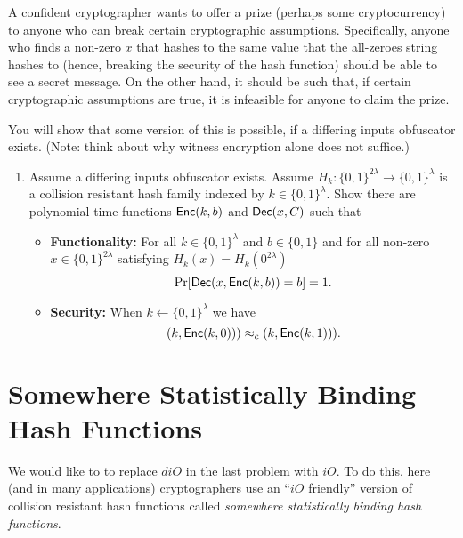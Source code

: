 \documentclass[11pt]{article}
\newcommand{\zo}{\{0,1\}}
\newcommand{\iO}{iO}
\newcommand{\diO}{diO}
\begin{document}
A confident cryptographer wants to offer a prize (perhaps some cryptocurrency) to anyone who can break certain cryptographic assumptions. Specifically,  anyone who finds a non-zero $x$ that hashes to the same value that the all-zeroes string hashes to (hence, breaking the security of the hash function) should be able to see a secret message. On the other hand, it should be such that, if certain cryptographic assumptions are true, it is infeasible for anyone to claim the prize.

You will show that some version of this is possible, if a differing inputs obfuscator exists. (Note: think about why witness encryption alone does not suffice.)

\begin{enumerate}
    \item Assume a differing inputs obfuscator exists. Assume $H_k: \zo^{2\lambda} \to \zo^\lambda$ is a collision resistant hash family indexed by $k \in \zo^\lambda$. Show there are polynomial time functions $\mathsf{Enc}(k, b)$ and $\mathsf{Dec}(x, C)$ such that
    \begin{itemize}
        \item \textbf{Functionality:} For all $k \in \zo^\lambda$ and $b \in \zo$ and for all non-zero $x \in \zo^{2\lambda}$ satisfying $H_k(x) = H_k(0^{2\lambda})$
        \[\Pr[\mathsf{Dec}(x, \mathsf{Enc}(k, b)) = b] = 1.\]
        \item \textbf{Security:} When $k \gets \zo^\lambda$ we have
\[(k, \mathsf{Enc}(k, 0))) \approx_c (k, \mathsf{Enc}(k, 1))).\]
    \end{itemize}
\end{enumerate}




\section{Somewhere Statistically Binding Hash Functions}
We would like to to replace $\diO$ in the last problem with $\iO$. To do this, here (and in many applications) cryptographers use an ``$\iO$ friendly'' version of collision resistant hash functions called \emph{somewhere statistically binding hash functions}.
\end{document}
